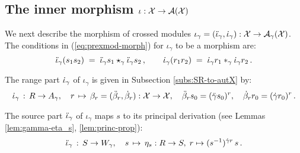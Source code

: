 \subsection{The inner morphism $\iota : \mathcal{X} \to \mathcal{A}(\mathcal{X})$}
\label{subs:inner-morphism}

We next describe the morphism of crossed modules
$\iota_{\gamma} = (\ddot{\iota}_{\gamma},\dot{\iota}_{\gamma}) 
 : \mathcal{X} \to \mathcal{A}_{\gamma}(\mathcal{X})$. 
The conditions in (\ref{eq:prexmod-morph}) 
for $\iota_{\gamma}$ to be a morphism are: 
\begin{equation} \label{eq:6}
\ddot{\iota}_{\gamma}(s_1s_2) 
\;=\; \ddot{\iota}_{\gamma} s_1 \star_{\gamma} \ddot{\iota}_{\gamma} s_2\,,
\quad\quad 
\dot{\iota}_{\gamma}(r_1r_2) \;=\; \dot{\iota}_{\gamma} r_1 \ast_{\gamma} \dot{\iota}_{\gamma} r_2\,.
\end{equation}

\noindent
The range part  $\dot{\iota}_{\gamma}$  of  $\iota_{\gamma}$  
is given in Subsection \ref{subs:SR-to-autX} by: 
$$
\dot{\iota}_{\gamma} \,:\, R \to A_{\gamma}, \quad
r \,\mapsto\, \beta_r = (\ddot{\beta}_r,\dot{\beta}_r) : \mathcal{X} \to \mathcal{X},
\quad \ddot{\beta}_r s_0 = (\ddot{\gamma} s_0)^r,
\quad  \dot{\beta}_r r_0 = (\dot{\gamma} r_0)^r\,.
$$

\noindent
The source part  $\ddot{\iota}_{\gamma}$  of $\iota_{\gamma}$  
maps $s$ to its principal derivation 
(see Lemmas \ref{lem:gamma-eta_s}, \ref{lem:princ-prop}): 
$$
\ddot{\iota}_{\gamma} \,:\, S \to W_{\gamma}, \quad 
s \,\mapsto\, \eta_s : R \to S,\; r \mapsto (s^{-1})^{\dot{\gamma} r}\,s\,.
$$

